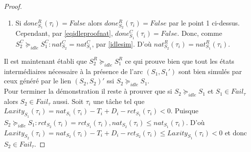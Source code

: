 \documentclass[a4paper]{report}
\theoremstyle{break}
\theoremstyle{breakplain}
\begin{document}
\begin{proof}
\begin{enumerate}[label=(\alph*)]
\item Si $done_{S_1}^R(\tau_i) = False$ alors $done_{S_2}^R(\tau_i) = False$ par le point 1 ci-dessus. Cependant, par \eqref{eqidleproofnat}, $done_{S_1}^C(\tau_i) = False$. Donc, comme $S^C_2 \succeq_{idle} S^C_1 : nat_{S_2}^C = nat_{S_1}^C$, par \autoref{idlesim}. D'où $nat_{S_2}^R(\tau_i) = nat_{S_1}^R(\tau_i)$.
\end{enumerate}
Il est maintenant établi que $S^R_2 \succeq_{idle} S^R_1$ ce qui prouve bien que tout les états intermédiaires nécessaire à la présence de l'arc $(S_1, S_1')$ sont bien simulés par ceux généré par le lien $(S_2, S_2)'$ ssi $S_2 \succeq_{idle} S_1$.\\

Pour terminer la démonstration il reste à prouver que si $S_2 \succeq_{idle} S_1$ et $S_1 \in Fail_\tau$ alors $S_2 \in Fail_\tau$ aussi. Soit $\tau_i$ une tâche tel que $Laxity_{S_1}(\tau_i) = nat_{S_1}(\tau_i) -T_i + D_i - rct_{S_1}(\tau_i) < 0$. Puisque $S_2 \succeq_{idle} S_1 : rct_{S_2}(\tau_i) = rct_{S_1}(\tau_i), nat_{S_2}(\tau_i) \leq nat_{S_1}(\tau_i)$. D'où $Laxity_{S_2}(\tau_i) = nat_{S_2}(\tau_i) -T_i + D_i - rct_{S_2}(\tau_i) \leq Laxity_{S_1}(\tau_i) < 0$ et donc $S_2 \in Fail_\tau$.

\end{proof}



%

\end{document}
